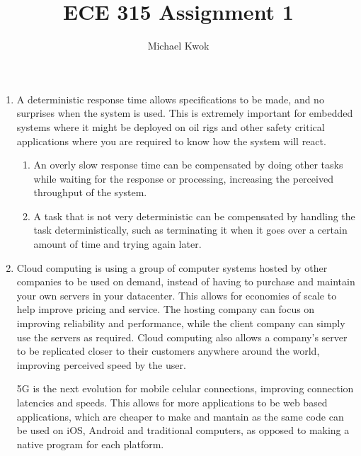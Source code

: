 \documentclass{article}
\title{ECE 315 Assignment 1}
\author{Michael Kwok}
\begin{document}
\maketitle

\begin{enumerate}
    \item A deterministic response time allows specifications to be made, and no surprises when the system is used. This is extremely important for embedded systems where it might be deployed on oil rigs and other safety critical applications where you are required to know how the system will react.
    \begin{enumerate}
        \item An overly slow response time can be compensated by doing other tasks while waiting for the response or processing, increasing the perceived throughput of the system.
        \item A task that is not very  deterministic can be compensated by handling the task deterministically, such as terminating it when it goes over a certain amount of time and trying again later.
    \end{enumerate}
    \item Cloud computing is using a group of computer systems hosted by other companies to be used on demand, instead of having to purchase and maintain your own servers in your datacenter. This allows for economies of scale to help improve pricing and service. The hosting company can focus on improving reliability and performance, while the client company can simply use the servers as required. Cloud computing also allows a company's server to be replicated closer to their customers anywhere around the world, improving perceived speed by the user.
    
5G is the next evolution for mobile celular connections, improving connection latencies and speeds. This allows for more applications to be web based applications, which are cheaper to make and mantain as the same code can be used on iOS, Android and traditional computers, as opposed to making a native program for each platform.


\end{enumerate}
\end{document}
